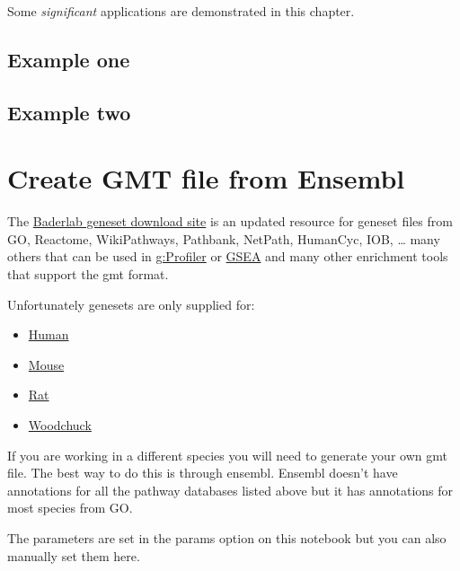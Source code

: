 \documentclass[
]{book}
\providecommand{\tightlist}{%
  \setlength{\itemsep}{0pt}\setlength{\parskip}{0pt}}
\begin{document}
Some \emph{significant} applications are demonstrated in this chapter.

\hypertarget{example-one}{%
\section{Example one}\label{example-one}}

\hypertarget{example-two}{%
\section{Example two}\label{example-two}}

\hypertarget{create-gmt-file-from-ensembl}{%
\chapter{Create GMT file from Ensembl}\label{create-gmt-file-from-ensembl}}

The \href{https://download.baderlab.org/EM_Genesets/}{Baderlab geneset download site} is an updated resource for geneset files from GO, Reactome, WikiPathways, Pathbank, NetPath, HumanCyc, IOB, \ldots{} many others that can be used in \href{https://biit.cs.ut.ee/gprofiler/gost}{g:Profiler} or \href{https://www.gsea-msigdb.org/gsea/index.jsp}{GSEA} and many other enrichment tools that support the gmt format.

Unfortunately genesets are only supplied for:

\begin{itemize}
\tightlist
\item
  \href{https://download.baderlab.org/EM_Genesets/current_release/Human/}{Human}
\item
  \href{https://download.baderlab.org/EM_Genesets/current_release/Mouse/}{Mouse}
\item
  \href{https://download.baderlab.org/EM_Genesets/current_release/Rat/}{Rat}
\item
  \href{https://download.baderlab.org/EM_Genesets/current_release/Woodchuck/}{Woodchuck}
\end{itemize}

If you are working in a different species you will need to generate your own gmt file. The best way to do this is through ensembl. Ensembl doesn't have annotations for all the pathway databases listed above but it has annotations for most species from GO.

The parameters are set in the params option on this notebook but you can also manually set them here.
\end{document}
